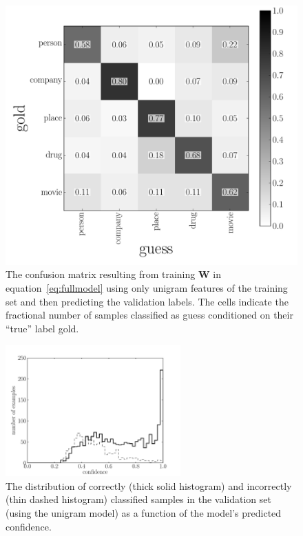 \documentclass[11pt]{article}
\newcommand{\figlabel}[1]{\label{fig:#1}}
\newcommand{\bvec}[1]{\ensuremath{\boldsymbol{#1}}}
\newcommand{\code}[1]{{\sffamily #1}}
\begin{document}
\begin{figure}[htbp]
\begin{center}
    \includegraphics[width=\textwidth]{unigram_confusion.pdf}
\end{center}
\caption{%
The confusion matrix resulting from training $\bvec{W}$ in
equation~\ref{eq:fullmodel} using only unigram features of the training set
and then predicting the validation labels.
The cells indicate the fractional number of samples classified as \code{guess}
conditioned on their ``true'' label \code{gold}.
\figlabel{unigram-confusion}}
\end{figure}

\begin{figure}[htbp]
\begin{center}
    \includegraphics[width=0.6\textwidth]{unigram_confidence_hist.pdf}
\end{center}
\caption{%
The distribution of correctly (thick solid histogram) and incorrectly (thin
dashed histogram) classified samples in the validation set (using the
unigram model) as a function of the model's predicted confidence.
\figlabel{unigram-confidence-hist}}
\end{figure}
\end{document}
